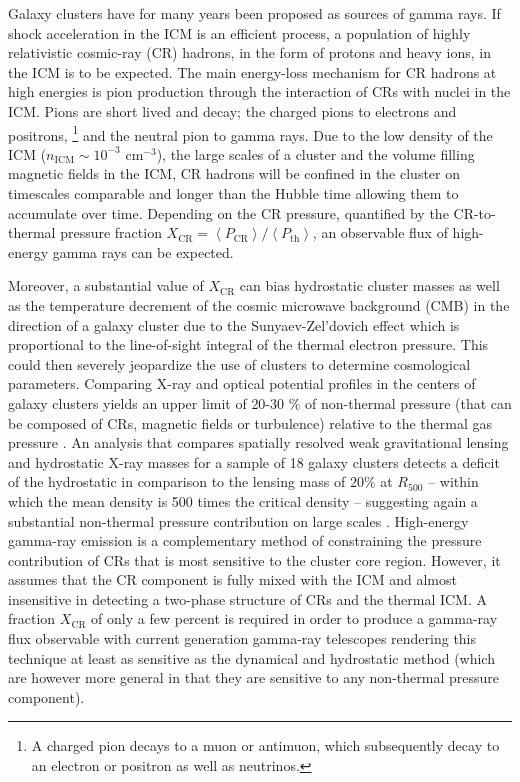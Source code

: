 \documentclass[12pt,manuscript]{aastex}
\newcommand{\expval}[1]{\left\langle #1 \right\rangle}
\newcommand{\CR}{\mathrm{CR}}
\begin{document}
Galaxy clusters have for many years been proposed as sources of gamma rays. If shock acceleration
in the ICM is an efficient process, a population of highly relativistic cosmic-ray (CR) hadrons,
in the form of protons and heavy ions, in the ICM is to be expected. The main energy-loss
mechanism for CR hadrons at high energies is pion production through the interaction of CRs with
nuclei in the ICM. Pions are short lived and decay; the charged pions to electrons and positrons,
\footnote{A charged pion decays to a muon or antimuon, which subsequently decay to an electron or
positron as well as neutrinos.} and the neutral pion to gamma rays. Due to the low density of the
ICM ($n_{\mathrm{ICM}}\sim 10^{-3}$ cm$^{-3}$), the large scales of a cluster and the volume
filling magnetic fields in the ICM, CR hadrons will be confined in the cluster on timescales
comparable and longer than the Hubble time \citep[][]{article:Volk_etal:1996,
article:Berezinsky_etal:1997} allowing them to accumulate over time. Depending on the CR pressure,
quantified by the CR-to-thermal pressure fraction
$X_\CR=\expval{P_{\CR}}/\expval{P_{\mathrm{th}}}$, an observable flux of high-energy gamma rays
can be expected.

Moreover, a substantial value of $X_\CR$ can bias hydrostatic cluster masses as well as the
temperature decrement of the cosmic microwave background (CMB) in the direction of a galaxy cluster
due to the Sunyaev-Zel'dovich effect which is proportional to the line-of-sight integral of the
thermal electron pressure. This could then severely jeopardize the use of clusters to determine
cosmological parameters. Comparing X-ray and optical potential profiles in the centers of galaxy
clusters yields an upper limit of 20-30 \% of non-thermal pressure (that can be composed of CRs,
magnetic fields or turbulence) relative to the thermal gas pressure
\citep{article:Churazov_etal:2008, article:Churazov_etal:2010}. An analysis that compares spatially
resolved weak gravitational lensing and hydrostatic X-ray masses for a sample of 18 galaxy clusters
detects a deficit of the hydrostatic in comparison to the lensing mass of $20 \%$ at $R_{500}$ --
within which the mean density is 500 times the critical density -- suggesting again a substantial
non-thermal pressure contribution on large scales \citep{article:Mahdavi_etal:2008}. High-energy
gamma-ray emission is a complementary method of constraining the pressure contribution of CRs that
is most sensitive to the cluster core region. However, it assumes that the CR component is fully
mixed with the ICM and almost insensitive in detecting a two-phase structure of CRs and the thermal
ICM.  A fraction $X_\CR$ of only a few percent is required in order to produce a gamma-ray flux
observable with current generation gamma-ray telescopes rendering this technique at least as
sensitive as the dynamical and hydrostatic method (which are however more general in that they are
sensitive to any non-thermal pressure component).
\end{document}

